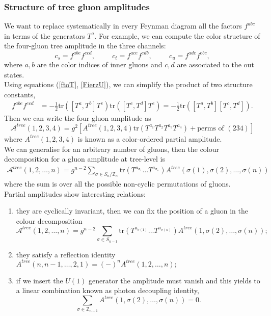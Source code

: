 \subsubsection{Structure of tree gluon amplitudes}
We want to replace systematically in every Feynman diagram all the factors $f^{abc}$ in terms of the generators $T^a$. For example, we can compute the color structure of the four-gluon tree amplitude in the three channels:
$$
	c_s=f^{abe}f^{ecd}, \hspace{1cm}c_t=f^{ace}f^{edb}, \hspace{1cm}c_u=f^{ade}f^{ebc},
$$
where $a,b$ are the color indices of inner gluons and $c,d$ are associated to the out states.\\
Using equations (\ref{ftoT}, \ref{FierzU}), we can simplify the product of two structure constants,
\begin{align*}
	f^{abe}f^{ecd}&=-\frac{1}{2}\text{tr}\left( [T^a,T^b]T^e\right)\text{tr}\left([T^c,T^d]T^e\right)=-\frac{1}{2}\text{tr}\left([T^a,T^b][T^c,T^d]\right).
\end{align*}
Then we can write the four gluon amplitude as \cite{2014}
$$
	\mathcal{A}^{tree}(1,2,3,4)=g^2\left[A^{tree}(1,2,3,4)\text{tr}(T^{a_1}T^{a_2}T^{a_3}T^{a_4})+\text{perms of }(234)\right]
$$
where $A^{tree}(1,2,3,4)$ is known as a color-ordered partial amplitude.\\
We can generalise for an arbitrary number of gluons, then the colour decomposition for a gluon amplitude at tree-level is \cite{Mangano:1988kk}
\begin{align}
	\mathcal{A}^{tree}(1,2,\dots,n)=g^{n-2} \sum_{\sigma\in S_n/\mathbb{Z}_{n}} \text{tr}\left(T^{a_{\sigma_1}}\dots T^{a_{\sigma_n}}\right) A^{tree}(\sigma(1),\sigma(2),\dots,\sigma(n))	\label{trbdectree}
\end{align}
where the sum is over all the possible non-cyclic permutations of gluons.\\
Partial amplitudes show interesting relations:
\begin{enumerate}
	\item they are cyclically invariant, then we can fix the position of a gluon in the colour decomposition
	$$
		\mathcal{A}^{tree}(1,2,\dots,n)=g^{n-2} \sum_{\sigma\in S_{n-1}} \text{tr}\left(T^{a_{\sigma(1)}}\dots T^{a_{\sigma(n)}}\right) A^{tree}(1,\sigma(2),\dots,\sigma(n));
	$$
	\item they satisfy a reflection identity
	$
		A^{tree}(n,n-1,\dots,2,1)=(-)^n A^{tree}(1,2,\dots,n);
	$
	\item if we insert the $U(1)$ generator the amplitude must vanish and this yields to a linear combination known as photon decoupling identity,
	$$
		\sum_{\sigma\in \mathbb{Z}_{n-1}} A^{tree}(1,\sigma(2),\dots,\sigma(n))=0.
	$$
\end{enumerate}
